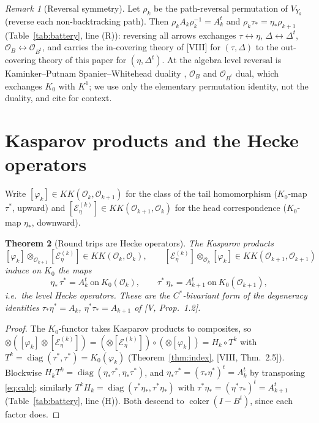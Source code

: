 \documentclass[11pt]{amsart}
\numberwithin{equation}{section}
\newtheorem{theorem}{Theorem}[section]
\theoremstyle{definition}
\theoremstyle{remark}
\newtheorem{remark}[theorem]{Remark}
\newcommand{\cO}{\mathcal{O}}
\newcommand{\cE}{\mathcal{E}}
\newcommand{\KK}{\mathit{KK}}
\newcommand{\coker}{\operatorname{coker}}
\newcommand{\ta}{\tau_*}
\newcommand{\taup}{\tau^*}
\newcommand{\et}{\eta_*}
\newcommand{\etp}{\eta^*}
\begin{document}
\begin{remark}[Reversal symmetry]\label{rem:reversal}
Let $\rho_k$ be the path-reversal permutation of $V_{Y_k}$ (reverse each non-backtracking
path). Then $\rho_kA_k\rho_k^{-1}=A_k^{t}$ and $\rho_k\ta=\et\rho_{k+1}$
(Table~\ref{tab:battery}, line (R)): reversing all arrows exchanges $\tau\leftrightarrow\eta$,
$\Delta\leftrightarrow\Delta^{t}$, $\cO_{B}\leftrightarrow\cO_{B^{t}}$, and carries the
in-covering theory of [VIII] for $(\tau,\Delta)$ to the out-covering theory of this paper
for $(\eta,\Delta^{t})$. At the algebra level reversal is Kaminker--Putnam
Spanier--Whitehead duality \cite{KP}, $\cO_{B}$ and $\cO_{B^{t}}$ dual, which exchanges
$K_0$ with $K^{1}$; we use only the elementary permutation identity, not the duality, and
cite \cite{KP} for context.
\end{remark}

\section{Kasparov products and the Hecke operators}\label{sec:products}

Write $[\varphi_k]\in\KK(\cO_k,\cO_{k+1})$ for the class of the tail homomorphism
($K_0$-map $\taup$, upward) and $[\cE_\eta^{(k)}]\in\KK(\cO_{k+1},\cO_k)$ for the head
correspondence ($K_0$-map $\et$, downward).

\begin{theorem}[Round trips are Hecke operators]\label{thm:hecke}
The Kasparov products
\[
[\varphi_k]\otimes_{\cO_{k+1}}[\cE_\eta^{(k)}]\in\KK(\cO_k,\cO_k),\qquad
[\cE_\eta^{(k)}]\otimes_{\cO_k}[\varphi_k]\in\KK(\cO_{k+1},\cO_{k+1})
\]
induce on $K_0$ the maps
\[
\et\,\taup=A_k^{t}\ \text{on}\ K_0(\cO_k),\qquad
\taup\,\et=A_{k+1}^{t}\ \text{on}\ K_0(\cO_{k+1}),
\]
i.e.\ the level Hecke operators. These are the $C^*$-bivariant form of the degeneracy
identities $\ta\etp=A_k$, $\etp\ta=A_{k+1}$ of {\rm[V, Prop.~1.2]}.
\end{theorem}

\begin{proof}
The $K_0$-functor takes Kasparov products to composites, so
$\otimes([\varphi_k]\otimes[\cE_\eta^{(k)}])=(\otimes[\cE_\eta^{(k)}])\circ(\otimes[\varphi_k])
=H_k\circ T^{k}$ with $T^{k}=\operatorname{diag}(\taup,\taup)=K_0(\varphi_k)$
(Theorem~\ref{thm:index}, [VIII, Thm.~2.5]). Blockwise
$H_kT^{k}=\operatorname{diag}(\et\taup,\et\taup)$, and $\et\taup=(\ta\etp)^{t}=A_k^{t}$ by
transposing \eqref{eq:calc}; similarly $T^{k}H_k=\operatorname{diag}(\taup\et,\taup\et)$ with
$\taup\et=(\etp\ta)^{t}=A_{k+1}^{t}$ (Table~\ref{tab:battery}, line (H)). Both descend to
$\coker(I-B^{t})$, since each factor does.
\end{proof}
\end{document}
